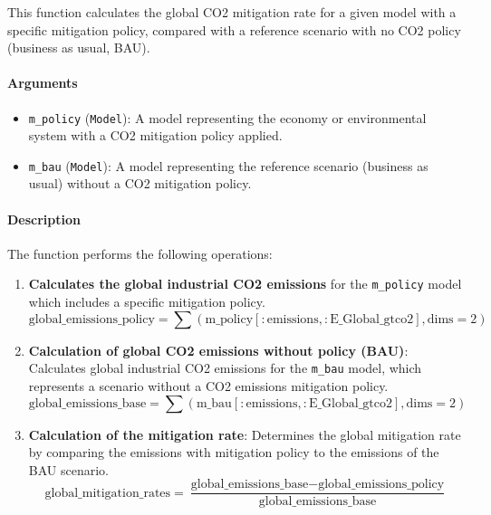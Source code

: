 \documentclass[
]{article}
\providecommand{\tightlist}{%
  \setlength{\itemsep}{0pt}\setlength{\parskip}{0pt}}
\begin{document}
This function calculates the global CO2 mitigation rate for a given
model with a specific mitigation policy, compared with a reference
scenario with no CO2 policy (business as usual, BAU).

\paragraph{Arguments}\label{arguments}

\begin{itemize}
\tightlist
\item
  \texttt{m\_policy} (\texttt{Model}): A model representing the economy
  or environmental system with a CO2 mitigation policy applied.
\item
  \texttt{m\_bau} (\texttt{Model}): A model representing the reference
  scenario (business as usual) without a CO2 mitigation policy.
\end{itemize}

\paragraph{Description}\label{description-1}

The function performs the following operations:
\begin{enumerate}
\def\labelenumi{\arabic{enumi}.}
\tightlist
\item
  \textbf{Calculates the global industrial CO2 emissions} for the
  \texttt{m\_policy} model which includes a specific mitigation policy.
  \begin{equation}
    \text{global\_emissions\_policy} = \sum (\text{m\_policy}[:\text{emissions}, :\text{E\_Global\_gtco2}], \text{dims}=2)
    \end{equation}
\item
  \textbf{Calculation of global CO2 emissions without policy (BAU)}:
  Calculates global industrial CO2 emissions for the \texttt{m\_bau}
  model, which represents a scenario without a CO2 emissions mitigation
  policy.
  \begin{equation}
    \text{global\_emissions\_base} = \sum (\text{m\_bau}[:\text{emissions}, :\text{E\_Global\_gtco2}], \text{dims}=2)
    \end{equation}
\item
  \textbf{Calculation of the mitigation rate}: Determines the global
  mitigation rate by comparing the emissions with mitigation policy to
  the emissions of the BAU scenario.
  \begin{equation}
    \text{global\_mitigation\_rates} = \frac{\text{global\_emissions\_base} - \text{global\_emissions\_policy}}{\text{global\_emissions\_base}}
    \end{equation}
\end{enumerate}
\end{document}
